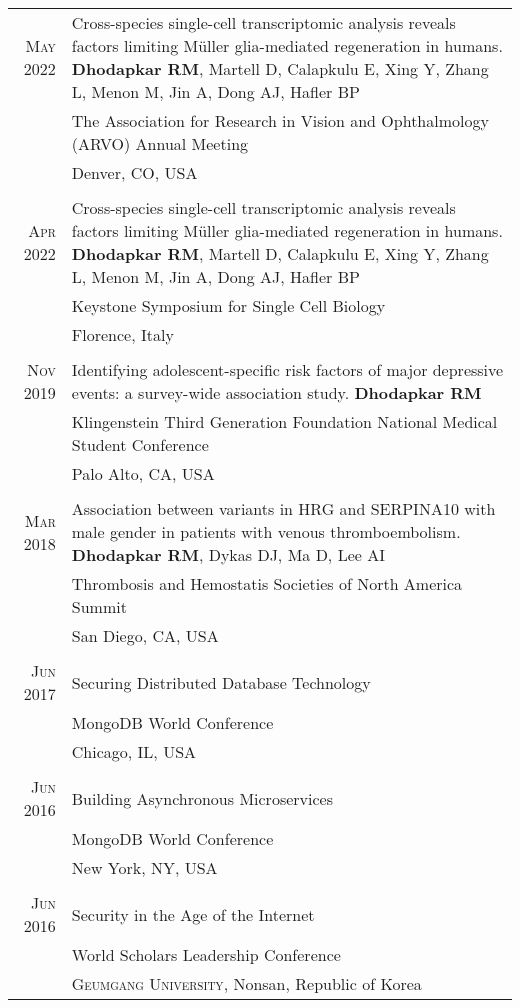 \documentclass[a4paper,10pt]{article}
\begin{document}
\begin{tabular}{rp{11cm}}

 \textsc{May} 2022 & Cross-species single-cell transcriptomic analysis reveals factors limiting Müller glia-mediated regeneration in humans. {\bf Dhodapkar RM}, Martell D, Calapkulu E, Xing Y, Zhang L, Menon M, Jin A, Dong AJ, Hafler BP \\
 								 & The Association for Research in Vision and Ophthalmology (ARVO) Annual Meeting \\
 								 & Denver, CO, USA  \\
 \multicolumn{2}{c}{} \\
 \textsc{Apr} 2022 & Cross-species single-cell transcriptomic analysis reveals factors limiting Müller glia-mediated regeneration in humans. {\bf Dhodapkar RM}, Martell D, Calapkulu E, Xing Y, Zhang L, Menon M, Jin A, Dong AJ, Hafler BP\\
 								 & Keystone Symposium for Single Cell Biology \\
 								 & Florence, Italy  \\
 \multicolumn{2}{c}{} \\
 \textsc{Nov} 2019 & Identifying adolescent-specific risk factors of major depressive events: a survey-wide association study. {\bf Dhodapkar RM} \\
 								 & Klingenstein Third Generation Foundation National Medical Student Conference \\
 								 & Palo Alto, CA, USA  \\
 \multicolumn{2}{c}{} \\
 \textsc{Mar} 2018 & Association between variants in HRG and SERPINA10 with male gender in patients with venous thromboembolism.
 {\bf Dhodapkar RM},  Dykas DJ,  Ma D,  Lee AI \\
 								 & Thrombosis and Hemostatis Societies of North America Summit \\
 								 & San Diego, CA, USA  \\
 \multicolumn{2}{c}{} \\
 \textsc{Jun} 2017 & Securing Distributed Database Technology \\
 								 & MongoDB World Conference\\
 								 & Chicago, IL, USA  \\
 \multicolumn{2}{c}{} \\
 \textsc{Jun} 2016 & Building Asynchronous Microservices \\
 								 & MongoDB World Conference\\
 								 & New York, NY, USA  \\
 \multicolumn{2}{c}{} \\
 \textsc{Jun} 2016 & Security in the Age of the Internet\\
 							    &  World Scholars Leadership Conference\\
 							    &  \textsc{Geumgang University}, Nonsan, Republic of Korea \\
\end{tabular}
\end{document}
